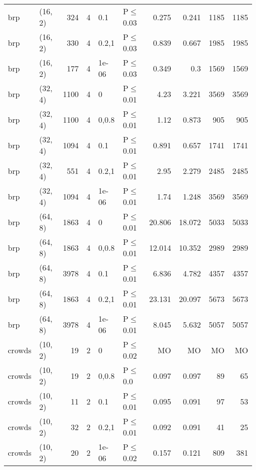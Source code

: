 \begin{longtable}{llrrllrrrr}
 brp           & (16, 2)  &    	324 &   4 & 0.1   & P$\leq$0.03  & 0.275   & 0.241   & 1185    & 1185 \\
 brp           & (16, 2)  &    	330 &   4 & 0.2,1 & P$\leq$0.03  & 0.839   & 0.667   & 1985    & 1985 \\
 brp           & (16, 2)  &    	177 &   4 & 1e-06 & P$\leq$0.03  & 0.349   & 0.3     & 1569    & 1569 \\
 brp           & (32, 4)  &   	1100 &   4 & 0     & P$\leq$0.01  & 4.23    & 3.221   & 3569    & 3569 \\
 brp           & (32, 4)  &   	1100 &   4 & 0,0.8 & P$\leq$0.01  & 1.12    & 0.873   & 905     & 905  \\
 brp           & (32, 4)  &   	1094 &   4 & 0.1   & P$\leq$0.01  & 0.891   & 0.657   & 1741    & 1741 \\
 brp           & (32, 4)  &    	551 &   4 & 0.2,1 & P$\leq$0.01  & 2.95    & 2.279   & 2485    & 2485 \\
 brp           & (32, 4)  &   	1094 &   4 & 1e-06 & P$\leq$0.01  & 1.74    & 1.248   & 3569    & 3569 \\
 brp           & (64, 8)  &   	1863 &   4 & 0     & P$\leq$0.01  & 20.806  & 18.072  & 5033    & 5033 \\
 brp           & (64, 8)  &   	1863 &   4 & 0,0.8 & P$\leq$0.01  & 12.014  & 10.352  & 2989    & 2989 \\
 brp           & (64, 8)  &   	3978 &   4 & 0.1   & P$\leq$0.01  & 6.836   & 4.782   & 4357    & 4357 \\
 brp           & (64, 8)  &   	1863 &   4 & 0.2,1 & P$\leq$0.01  & 23.131  & 20.097  & 5673    & 5673 \\
 brp           & (64, 8)  &   	3978 &   4 & 1e-06 & P$\leq$0.01  & 8.045   & 5.632   & 5057    & 5057 \\
 crowds        & (10, 2)  &     	19 &   2 & 0     & P$\leq$0.02  & MO      & MO      & MO      & MO   \\
 crowds        & (10, 2)  &     	19 &   2 & 0,0.8 & P$\leq$0.0   & 0.097   & 0.097   & 89      & 65   \\
 crowds        & (10, 2)  &     	11 &   2 & 0.1   & P$\leq$0.01  & 0.095   & 0.091   & 97      & 53   \\
 crowds        & (10, 2)  &     	32 &   2 & 0.2,1 & P$\leq$0.01  & 0.092   & 0.091   & 41      & 25   \\
 crowds        & (10, 2)  &     	20 &   2 & 1e-06 & P$\leq$0.02  & 0.157   & 0.121   & 809     & 381  \\

\end{longtable}
